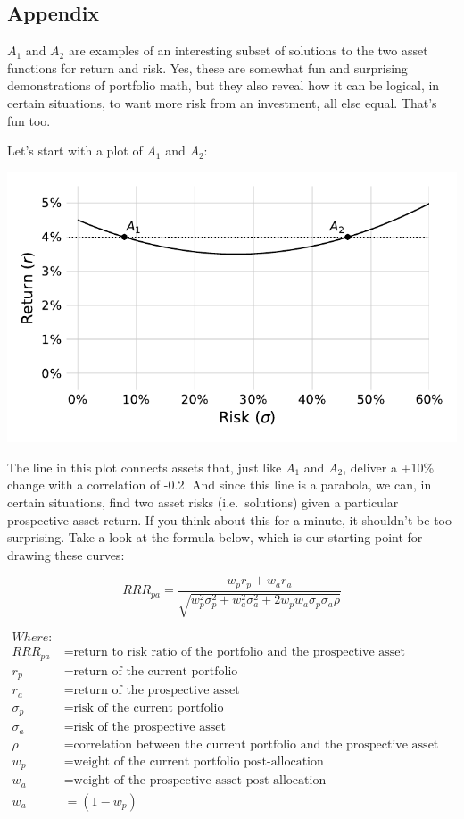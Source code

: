 \documentclass[]{article}
\begin{document}
\hypertarget{appendix}{%
\subsection{Appendix}\label{appendix}}

\(A_1\) and \(A_2\) are examples of an interesting subset of solutions
to the two asset functions for return and risk. Yes, these are somewhat
fun and surprising demonstrations of portfolio math, but they also
reveal how it can be logical, in certain situations, to want more risk
from an investment, all else equal. That's fun too.

Let's start with a plot of \(A_1\) and \(A_2\):

\begin{center}\includegraphics{paper_files/figure-latex/A1 A2-1} \end{center}

The line in this plot connects assets that, just like \(A_1\) and
\(A_2\), deliver a +10\% change with a correlation of -0.2. And since
this line is a parabola, we can, in certain situations, find two asset
risks (i.e.~solutions) given a particular prospective asset return. If
you think about this for a minute, it shouldn't be too surprising. Take
a look at the formula below, which is our starting point for drawing
these curves:

\[
RRR_{pa} = \frac{w_p r_p + w_a r_a}{\sqrt{w_p^2 \sigma_p^2 + w_a^2 \sigma_a^2 + 2 w_p w_a \sigma_p \sigma_a \rho}}
\]

\[
\begin{aligned}
Where: & \\
RRR_{pa} & = \text{return to risk ratio of the portfolio and the prospective asset combination} \\
r_p & = \text{return of the current portfolio} \\
r_a & = \text{return of the prospective asset} \\
\sigma_p & = \text{risk of the current portfolio} \\
\sigma_a & = \text{risk of the prospective asset} \\
\rho & = \text{correlation between the current portfolio and the prospective asset} \\
w_p & = \text{weight of the current portfolio post-allocation} \\
w_a & = \text{weight of the prospective asset post-allocation} \\
w_a & = (1 - w_p)
\end{aligned}
\]
\end{document}
